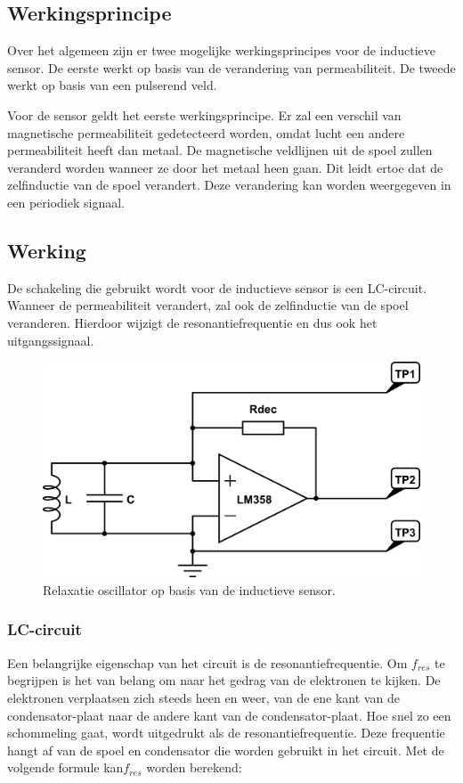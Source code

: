 \documentclass{report}
\begin{document}
\subsection{Werkingsprincipe}
\label{ssec:werking}
Over het algemeen zijn er twee mogelijke werkingsprincipes voor de inductieve sensor. De eerste werkt op basis van de verandering van permeabiliteit. De tweede werkt op basis van een pulserend veld. 

Voor de sensor geldt het eerste werkingsprincipe. Er zal een verschil van magnetische permeabiliteit gedetecteerd worden, omdat lucht een andere permeabiliteit heeft dan metaal. De magnetische veldlijnen uit de spoel zullen veranderd worden wanneer ze door het metaal heen gaan. Dit leidt ertoe dat de zelfinductie van de spoel verandert. Deze verandering kan worden weergegeven in een periodiek signaal.

\newpage
\subsection{Werking}

De schakeling die gebruikt wordt voor de inductieve sensor is een LC-circuit. Wanneer de permeabiliteit verandert, zal ook de zelfinductie van de spoel veranderen. Hierdoor wijzigt de resonantiefrequentie en dus ook het uitgangssignaal.

\begin{figure}[H]
\centering
\includegraphics[scale=0.45]{inductieve_sensor.png}
\caption{Relaxatie oscillator op basis van de inductieve sensor.}
\label{fig:schakeling_sensor}
\end{figure}

\subsubsection{LC-circuit}
Een belangrijke eigenschap van het circuit is de resonantiefrequentie. Om $f_{res}$ te begrijpen is het van belang om naar het gedrag van de elektronen te kijken. De elektronen verplaatsen zich steeds heen en weer, van de ene kant van de condensator-plaat naar de andere kant van de condensator-plaat. Hoe snel zo een schommeling gaat, wordt uitgedrukt als de resonantiefrequentie. Deze frequentie hangt af van de spoel en condensator die worden gebruikt in het circuit. Met de volgende formule kan$f_{res}$ worden berekend:
\end{document}
